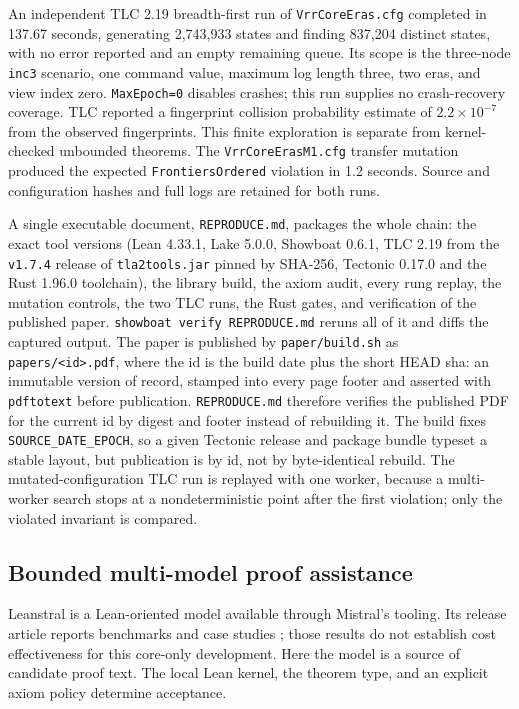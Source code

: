 \documentclass[10pt,journal,letterpaper]{IEEEtran}
\newcommand{\code}[1]{\texttt{\small #1}}
\begin{document}
An independent TLC 2.19 breadth-first run of \code{VrrCoreEras.cfg} completed
in 137.67 seconds, generating 2,743,933 states and finding 837,204 distinct
states, with no error reported and an empty remaining queue. Its scope is
the three-node \code{inc3} scenario, one command value, maximum log length
three, two eras, and view index zero. \code{MaxEpoch=0} disables crashes;
this run supplies no crash-recovery coverage. TLC reported a fingerprint
collision probability estimate of $2.2\times10^{-7}$ from the observed
fingerprints. This finite exploration is separate from kernel-checked
unbounded theorems. The \code{VrrCoreErasM1.cfg} transfer mutation produced
the expected \code{FrontiersOrdered} violation in 1.2 seconds. Source and
configuration hashes and full logs are retained for both runs.

A single executable document, \code{REPRODUCE.md}, packages the whole
chain: the exact tool versions (Lean 4.33.1, Lake 5.0.0, Showboat 0.6.1,
TLC 2.19 from the \code{v1.7.4} release of \code{tla2tools.jar} pinned by
SHA-256, Tectonic 0.17.0 and the Rust 1.96.0 toolchain), the library build,
the axiom audit, every rung replay, the mutation controls, the two TLC
runs, the Rust gates, and verification of the published paper.
\code{showboat verify REPRODUCE.md} reruns
all of it and diffs the captured output. The paper is published by
\code{paper/build.sh} as \code{papers/<id>.pdf}, where the id is the build
date plus the short HEAD sha: an immutable version of record, stamped into
every page footer and asserted with \code{pdftotext} before publication.
\code{REPRODUCE.md} therefore verifies the published PDF for the current id
by digest and footer instead of rebuilding it. The build fixes
\code{SOURCE\_DATE\_EPOCH}, so a given Tectonic release and package bundle
typeset a stable layout, but publication is by id, not by byte-identical
rebuild. The mutated-configuration TLC run is replayed with one worker,
because a multi-worker search stops at a nondeterministic point after the
first violation; only the violated invariant is compared.

\subsection{Bounded multi-model proof assistance}
Leanstral is a Lean-oriented model available through Mistral's tooling. Its
release article reports benchmarks and case studies \cite{leanstral}; those
results do not establish cost effectiveness for this core-only development.
Here the model is a source of candidate proof text. The local Lean kernel,
the theorem type, and an explicit axiom policy determine acceptance.
\end{document}
